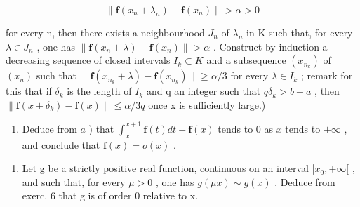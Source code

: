 \[
\| \mathbf {f} (x _ {n} + \lambda_ {n}) - \mathbf {f} (x _ {n}) \| > \alpha > 0
\]

for every n, then there exists a neighbourhood \(J_{n}\) of \(\lambda_{n}\) in K such that, for every \(\lambda \in J_{n}\) , one has \(\|\mathbf{f}(x_{n} + \lambda) - \mathbf{f}(x_{n})\| > \alpha\) . Construct by induction a decreasing sequence of closed intervals \(I_{k} \subset K\) and a subsequence \((x_{n_{k}})\) of \((x_{n})\) such that \(\|\mathbf{f}(x_{n_{k}} + \lambda) - \mathbf{f}(x_{n_{k}})\| \geqslant \alpha/3\) for every \(\lambda \in I_{k}\) ; remark for this that if \(\delta_{k}\) is the length of \(I_{k}\) and q an integer such that \(q\delta_{k} > b - a\) , then \(\|\mathbf{f}(x + \delta_{k}) - \mathbf{f}(x)\| \leqslant \alpha/3q\) once x is sufficiently large.)

\begin{enumerate}
\def\labelenumi{\alph{enumi})}
\setcounter{enumi}{1}
\tightlist
\item
  Deduce from \(a\) ) that \(\int_{x}^{x + 1}\mathbf{f}(t)dt - \mathbf{f}(x)\) tends to 0 as \(x\) tends to \(+\infty\) , and conclude that \(\mathbf{f}(x) = o(x)\) .
\end{enumerate}

\begin{enumerate}
\def\labelenumi{\arabic{enumi})}
\setcounter{enumi}{6}
\tightlist
\item
  Let g be a strictly positive real function, continuous on an interval \([x_{0}, +\infty[\) , and such that, for every \(\mu > 0\) , one has \(g(\mu x) \sim g(x)\) . Deduce from exerc. 6 that g is of order 0 relative to x.
\end{enumerate}

\setcounter{exercisegroup}{3}
